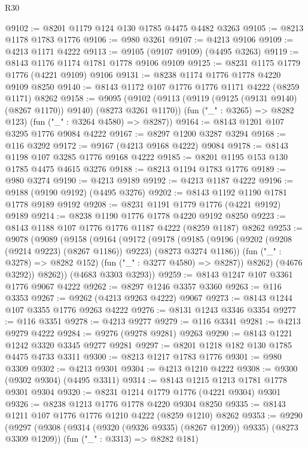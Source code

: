 \begin{lexlean}{R30}
\begin{coremodule}
{{{{{@9102 := @8201 @1179 @124 @130 @1785 @4475 @4482 @3263
@9105 := @8213 @1178 @1783 @1776
@9106 := @980 @3261
@9107 := @4213 @9106
@9109 := @4213 @1171 @4222
@9113 := @9105 (@9107 @9109) (@4495 @3263)
@9119 := @8143 @1176 @1174 @1781 @1778 @9106 @9109
@9125 := @8231 @1175 @1779 @1776 (@4221 @9109) @9106
@9131 := @8238 @1174 @1776 @1778 @4220 @9109 @8250
@9140 := @8143 @1172 @107 @1776 @1776 @1171 @4222 (@8259 @1171) @8262
@9158 := @9095
    (@9102
      (@9113 (@9119 (@9125 (@9131 @9140) (@8267 @1170)) @9140) (@8273 @3261 @1170))
      (fun ("_" : @3265) => @8282 @123)
      (fun ("_" : @3264 @4580) => @8287))
@9164 := @8143 @1201 @107 @3295 @1776 @9084 @4222
@9167 := @8297 @1200 @3287 @3294
@9168 := @116 @3292
@9172 := @9167 (@4213 @9168 @4222) @9084
@9178 := @8143 @1198 @107 @3285 @1776 @9168 @4222
@9185 := @8201 @1195 @153 @130 @1785 @4475 @4615 @3276
@9188 := @8213 @1194 @1783 @1776
@9189 := @980 @3274
@9190 := @4213 @9189
@9192 := @4213 @1187 @4222
@9196 := @9188 (@9190 @9192) (@4495 @3276)
@9202 := @8143 @1192 @1190 @1781 @1778 @9189 @9192
@9208 := @8231 @1191 @1779 @1776 (@4221 @9192) @9189
@9214 := @8238 @1190 @1776 @1778 @4220 @9192 @8250
@9223 := @8143 @1188 @107 @1776 @1776 @1187 @4222 (@8259 @1187) @8262
@9253 := @9078
    (@9089
      (@9158
        (@9164
          (@9172
            (@9178
              (@9185
                (@9196 (@9202 (@9208 (@9214 @9223) (@8267 @1186)) @9223) (@8273 @3274 @1186))
                (fun ("_" : @3278) => @8282 @152)
                (fun ("_" : @3277 @4580) => @8287))
              @8262)
            (@4676 @3292))
          @8262))
      (@4683 @3303 @3293))
@9259 := @8143 @1247 @107 @3361 @1776 @9067 @4222
@9262 := @8297 @1246 @3357 @3360
@9263 := @116 @3353
@9267 := @9262 (@4213 @9263 @4222) @9067
@9273 := @8143 @1244 @107 @3355 @1776 @9263 @4222
@9276 := @8131 @1243 @3346 @3354
@9277 := @116 @3351
@9278 := @4213 @9277
@9279 := @116 @3341
@9281 := @4213 @9279 @4222
@9284 := @9276 (@9278 @9281) @9263
@9290 := @8143 @1221 @1242 @3320 @3345 @9277 @9281
@9297 := @8201 @1218 @182 @130 @1785 @4475 @4733 @3311
@9300 := @8213 @1217 @1783 @1776
@9301 := @980 @3309
@9302 := @4213 @9301
@9304 := @4213 @1210 @4222
@9308 := @9300 (@9302 @9304) (@4495 @3311)
@9314 := @8143 @1215 @1213 @1781 @1778 @9301 @9304
@9320 := @8231 @1214 @1779 @1776 (@4221 @9304) @9301
@9326 := @8238 @1213 @1776 @1778 @4220 @9304 @8250
@9335 := @8143 @1211 @107 @1776 @1776 @1210 @4222 (@8259 @1210) @8262
@9353 := @9290
    (@9297
      (@9308 (@9314 (@9320 (@9326 @9335) (@8267 @1209)) @9335) (@8273 @3309 @1209))
      (fun ("_" : @3313) => @8282 @181)
}}}}}
\end{coremodule}
\end{lexlean}
